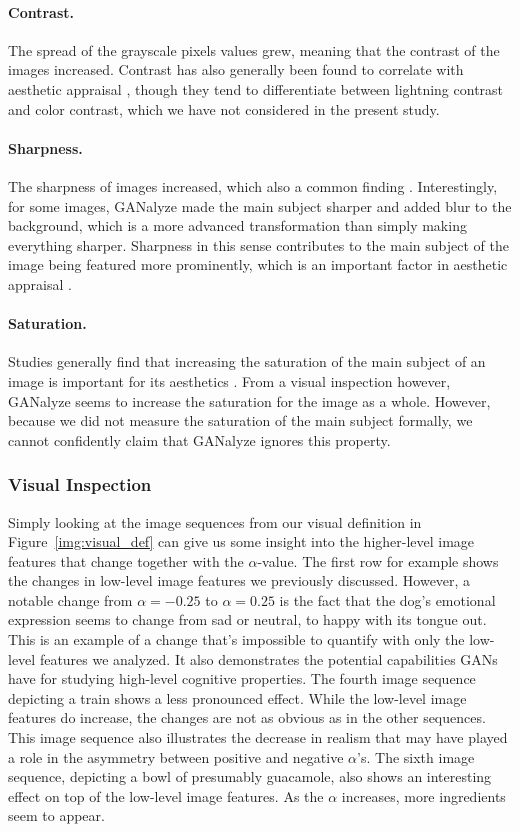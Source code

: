 \documentclass[../main.tex]{subfiles}
\begin{document}
\paragraph{Contrast.} The spread of the grayscale pixels values grew, meaning that the contrast of the images increased. Contrast has also generally been found to correlate with aesthetic appraisal \parencite{wong2009saliency}, though they tend to differentiate between lightning contrast and color contrast, which we have not considered in the present study.

\paragraph{Sharpness.} The sharpness of images increased, which also a common finding \parencite{redi2015beauty}. Interestingly, for some images, GANalyze made the main subject sharper and added blur to the background, which is a more advanced transformation than simply making everything sharper. Sharpness in this sense contributes to the main subject of the image being featured more prominently, which is an important factor in aesthetic appraisal \parencite{wong2009saliency}.

\paragraph{Saturation.} Studies generally find that increasing the saturation of the main subject of an image is important for its aesthetics \parencite{wong2009saliency}. From a visual inspection however, GANalyze seems to increase the saturation for the image as a whole. However, because we did not measure the saturation of the main subject formally, we cannot confidently claim that GANalyze ignores this property.

\subsubsection{Visual Inspection}
Simply looking at the image sequences from our visual definition in Figure~\ref{img:visual_def} can give us some insight into the higher-level image features that change together with the $\alpha$-value. The first row for example shows the changes in low-level image features we previously discussed. However, a notable change from $\alpha=-0.25$ to $\alpha=0.25$ is the fact that the dog's emotional expression seems to change from sad or neutral, to happy with its tongue out. This is an example of a change that's impossible to quantify with only the low-level features we analyzed. It also demonstrates the potential capabilities GANs have for studying high-level cognitive properties. The fourth image sequence depicting a train shows a less pronounced effect. While the low-level image features do increase, the changes are not as obvious as in the other sequences. This image sequence also illustrates the decrease in realism that may have played a role in the asymmetry between positive and negative $\alpha$'s. The sixth image sequence, depicting a bowl of presumably guacamole, also shows an interesting effect on top of the low-level image features. As the $\alpha$ increases, more ingredients seem to appear.
\end{document}
